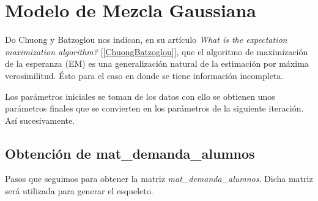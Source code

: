 \section{Modelo de Mezcla Gaussiana} \label{sec_GMM}

Do Chuong y Batzoglou nos indican, en su artículo \textit{What is the expectation maximization algorithm?} [\ref{ChuongBatzoglou}], que el algoritmo de maximización de la esperanza (EM) es una generalización natural de la estimación por máxima verosimilitud. Ésto para el caso en donde se tiene información incompleta.

Los parámetros iniciales se toman de los datos con ello se obtienen unos parámetros finales que se convierten en los parámetros de la siguiente iteración. Así sucesivamente.


%
%
%
%
%
%

\subsection{Obtención de mat\_demanda\_alumnos} \label{GMM_D}

Pasos que seguimos para obtener la matriz \textit{mat\_demanda\_alumnos}. Dicha matriz será utilizada para generar el esqueleto.

